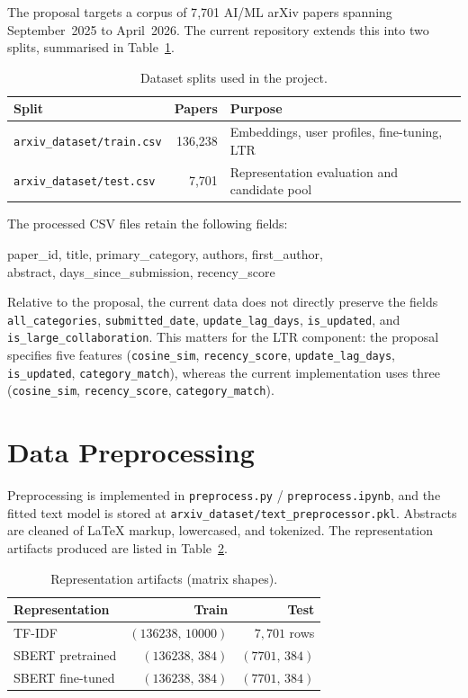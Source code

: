 \documentclass[12pt,a4paper]{article}
\begin{document}
The proposal targets a corpus of 7{,}701 AI/ML arXiv papers spanning
September~2025 to April~2026. The current repository extends this into two
splits, summarised in Table~\ref{tab:dataset}.

\begin{table}[H]
\centering
\caption{Dataset splits used in the project.}\label{tab:dataset}
\begin{tabular}{lrl}
\toprule
\textbf{Split} & \textbf{Papers} & \textbf{Purpose}\\
\midrule
\texttt{arxiv\_dataset/train.csv} & 136{,}238 & Embeddings, user profiles, fine-tuning, LTR\\
\texttt{arxiv\_dataset/test.csv}  & 7{,}701   & Representation evaluation and candidate pool\\
\bottomrule
\end{tabular}
\end{table}

The processed CSV files retain the following fields:
\begin{center}\ttfamily\small
paper\_id, title, primary\_category, authors, first\_author,\\
abstract, days\_since\_submission, recency\_score
\end{center}

Relative to the proposal, the current data does not directly preserve the
fields \texttt{all\_categories}, \texttt{submitted\_date},
\texttt{update\_lag\_days}, \texttt{is\_updated}, and
\texttt{is\_large\_collaboration}. This matters for the LTR component: the
proposal specifies five features
(\texttt{cosine\_sim}, \texttt{recency\_score}, \texttt{update\_lag\_days},
\texttt{is\_updated}, \texttt{category\_match}), whereas the current
implementation uses three
(\texttt{cosine\_sim}, \texttt{recency\_score}, \texttt{category\_match}).

\section{Data Preprocessing}

Preprocessing is implemented in \texttt{preprocess.py} /
\texttt{preprocess.ipynb}, and the fitted text model is stored at
\texttt{arxiv\_dataset/text\_preprocessor.pkl}. Abstracts are cleaned of
LaTeX markup, lowercased, and tokenized. The representation artifacts produced
are listed in Table~\ref{tab:repr-artifacts}.

\begin{table}[H]
\centering
\caption{Representation artifacts (matrix shapes).}\label{tab:repr-artifacts}
\begin{tabular}{lrr}
\toprule
\textbf{Representation} & \textbf{Train} & \textbf{Test}\\
\midrule
TF-IDF          & $(136238,\,10000)$ & $7{,}701$ rows\\
SBERT pretrained & $(136238,\,384)$   & $(7701,\,384)$\\
SBERT fine-tuned & $(136238,\,384)$   & $(7701,\,384)$\\
\bottomrule
\end{tabular}
\end{table}
\end{document}
